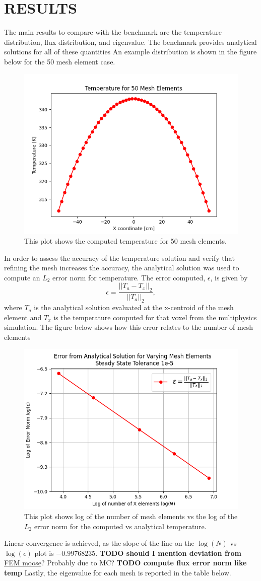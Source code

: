 \documentclass[letterpaper]{mc2023}
\begin{document}
\section{RESULTS}\label{sec:results}
The main results to compare with the benchmark are the temperature distribution, flux distribution, and eigenvalue. The benchmark provides
analytical solutions for all of these quantities An example distribution is shown in the figure below for the 50 mesh element case.
\begin{figure}[H]
    \centering
    \includegraphics[width=0.45\linewidth]{figures/temp_50.png}
    \caption{This plot shows the computed temperature for 50 mesh elements.}
    \label{fig:temp50}
\end{figure}
In order to assess the accuracy of the temperature solution and verify that refining the mesh increases the accuracy, the analytical solution
was used to compute an $L_{2}$ error norm for temperature. The error computed, $\epsilon$, is given by
\begin{equation}
    \epsilon = \frac{|| T_{a} - T_{x} ||_{2}}{|| T_{a} ||_{2}},
\end{equation}
where $T_{a}$ is the analytical solution evaluated at the x-centroid of the mesh element and $T_{x}$ is the temperature computed for that
voxel from the multiphysics simulation. The figure below shows how this error relates to the number of mesh elements
\begin{figure}[H]
    \centering
    \includegraphics[width=0.55\linewidth]{figures/error_study.png}
    \caption{This plot shows log of the number of mesh elements vs the log of the $L_{2}$ error norm for the computed vs analytical temperature.}
    \label{fig:error_study}
\end{figure}
Linear convergence is achieved, as the slope of the line on the $\log(N)$ vs $\log(\epsilon)$ plot is $-0.99768235$.
\textbf{TODO should I mention deviation from} \href{https://mooseframework.inl.gov/getting_started/examples_and_tutorials/tutorial03_verification/step02_fem_convergence.html}{FEM moose}? Probably due to MC?
\textbf{TODO compute flux error norm like temp}
Lastly, the eigenvalue for each mesh is reported in the table below.
\end{document}
